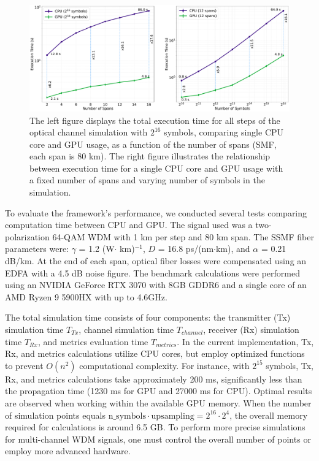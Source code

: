 \begin{figure}[t]
   \centering
    \includegraphics[width=1\linewidth]{images/hpcom/total.pdf}
    \caption{The left figure displays the total execution time for all steps of the optical channel simulation with $2^{16}$ symbols, comparing single CPU core and GPU usage, as a function of the number of spans (SMF, each span is 80 km). The right figure illustrates the relationship between execution time for a single CPU core and GPU usage with a fixed number of spans and varying number of symbols in the simulation.}
    \label{fig:total}
\end{figure}

To evaluate the framework's performance, we conducted several tests comparing computation time between CPU and GPU. The signal used was a two-polarization 64-QAM WDM with 1 km per step and 80 km span. The SSMF fiber parameters were: $\gamma$ = 1.2 (W$\cdot$ km)$^{-1}$, $D$ = 16.8 ps/(nm$\cdot$km), and $\alpha$ = 0.21 dB/km. At the end of each span, optical fiber losses were compensated using an EDFA with a 4.5 dB noise figure. The benchmark calculations were performed using an NVIDIA GeForce RTX 3070 with 8GB GDDR6 and a single core of an AMD Ryzen 9 5900HX with up to 4.6GHz.

The total simulation time consists of four components: the transmitter (Tx) simulation time $T_{Tx}$, channel simulation time $T_{channel}$, receiver (Rx) simulation time $T_{Rx}$, and metrics evaluation time $T_{metrics}$. In the current implementation, Tx, Rx, and metrics calculations utilize CPU cores, but employ optimized functions to prevent $O(n^2)$ computational complexity. For instance, with $2^{15}$ symbols, Tx, Rx, and metrics calculations take approximately 200 ms, significantly less than the propagation time (1230 ms for GPU and 27000 ms for CPU). Optimal results are observed when working within the available GPU memory. When the number of simulation points equals $\mathrm{n\_symbols} \cdot \mathrm{upsampling} = 2^{16} \cdot 2^{4}$, the overall memory required for calculations is around 6.5 GB. To perform more precise simulations for multi-channel WDM signals, one must control the overall number of points or employ more advanced hardware.

